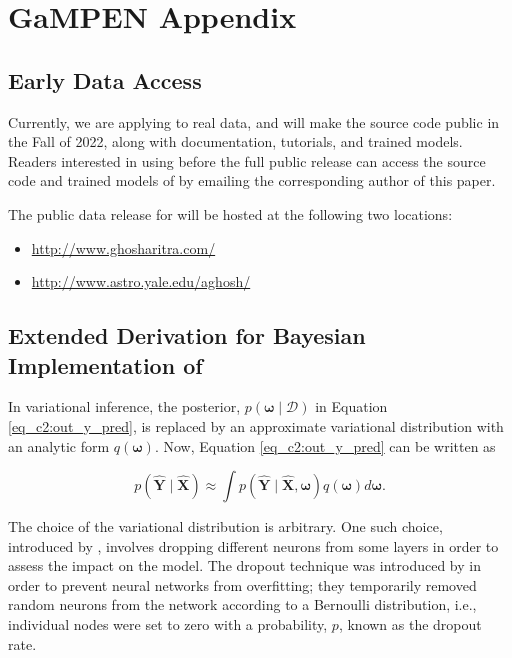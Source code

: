 
\chapter*{GaMPEN Appendix}\label{ch:gampen_appendix}

\section{Early Data Access}\label{sec_c2:ap:data_access}
Currently, we are applying \gampen{} to real data, and will make the source code public in the Fall of 2022, along with documentation, tutorials, and trained models. Readers interested in using \gampen{} before the full public release can access the source code and trained models of \gampen{} by emailing the corresponding author of this paper. 

The public data release for \gampen{} will be hosted at the following two locations:

\begin{itemize}
    \item \href{http://www.ghosharitra.com/}{http://www.ghosharitra.com/}
    \item \href{http://www.astro.yale.edu/aghosh/}{http://www.astro.yale.edu/aghosh/}
\end{itemize}


\section{Extended Derivation for Bayesian Implementation of \gampen{}} \label{sec_c2:ap:mcd_deri}

In variational inference, the posterior, $p(\boldsymbol{\omega} \mid \mathcal{D})$ in Equation \ref{eq_c2:out_y_pred}, is replaced by an approximate variational distribution with an analytic form $q(\boldsymbol{\omega})$. Now, Equation \ref{eq_c2:out_y_pred} can be written as

\begin{equation}
p(\boldsymbol{\hat{Y}} \mid \boldsymbol{\hat{X}}) \approx \int p(\boldsymbol{\hat{Y}} \mid \boldsymbol{\hat{X}}, \boldsymbol{\omega}) q(\boldsymbol{\omega}) d \boldsymbol{\omega} .
\label{eq_c2:out_y_pred_vi}
\end{equation}

The choice of the variational distribution is arbitrary. 
One such choice, introduced by \cite{gal_2016}, involves dropping different neurons from some layers in order to assess the impact on the model. 
The dropout technique was introduced by \cite{Srivastava2014Dropout:Overfitting} in order to prevent neural networks from overfitting; they temporarily removed random neurons from the network according to a Bernoulli distribution, i.e., individual nodes were set to zero with a probability, $p$, known as the dropout rate. 

